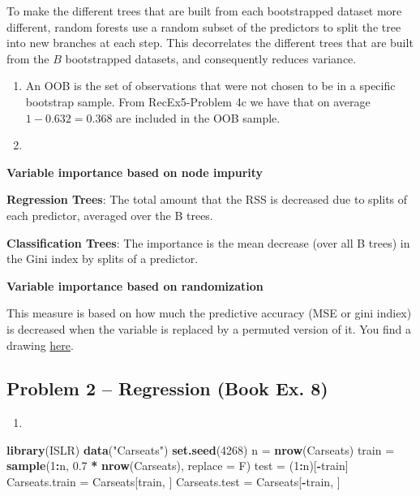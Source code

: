 \documentclass[]{article}
\newenvironment{Shaded}{\begin{snugshade}}{\end{snugshade}}
\newcommand{\DataTypeTok}[1]{\textcolor[rgb]{0.13,0.29,0.53}{#1}}
\newcommand{\DecValTok}[1]{\textcolor[rgb]{0.00,0.00,0.81}{#1}}
\newcommand{\FloatTok}[1]{\textcolor[rgb]{0.00,0.00,0.81}{#1}}
\newcommand{\KeywordTok}[1]{\textcolor[rgb]{0.13,0.29,0.53}{\textbf{#1}}}
\newcommand{\NormalTok}[1]{#1}
\newcommand{\OperatorTok}[1]{\textcolor[rgb]{0.81,0.36,0.00}{\textbf{#1}}}
\newcommand{\StringTok}[1]{\textcolor[rgb]{0.31,0.60,0.02}{#1}}
\begin{document}
To make the different trees that are built from each bootstrapped
dataset more different, random forests use a random subset of the
predictors to split the tree into new branches at each step. This
decorrelates the different trees that are built from the \(B\)
bootstrapped datasets, and consequently reduces variance.

\begin{enumerate}
\def\labelenumi{\alph{enumi})}
\setcounter{enumi}{3}
\item
  An OOB is the set of observations that were not chosen to be in a
  specific bootstrap sample. From RecEx5-Problem 4c we have that on
  average \(1-0.632 = 0.368\) are included in the OOB sample.
\item
\end{enumerate}

\textbf{Variable importance based on node impurity}

\textbf{Regression Trees}: The total amount that the RSS is decreased
due to splits of each predictor, averaged over the B trees.

\textbf{Classification Trees}: The importance is the mean decrease (over
all B trees) in the Gini index by splits of a predictor.

\textbf{Variable importance based on randomization}

This measure is based on how much the predictive accuracy (MSE or gini
indiex) is decreased when the variable is replaced by a permuted version
of it. You find a drawing
\href{https://github.com/stefaniemuff/statlearning/blob/master/8Trees/M8_variableImportanceRandomization.pdf}{here}.

\hypertarget{problem-2-regression-book-ex.-8}{%
\subsection{Problem 2 -- Regression (Book Ex.
8)}\label{problem-2-regression-book-ex.-8}}

\begin{enumerate}
\def\labelenumi{\alph{enumi})}
\item
\end{enumerate}

\begin{Shaded}
\begin{Highlighting}[]
\KeywordTok{library}\NormalTok{(ISLR)}
\KeywordTok{data}\NormalTok{(}\StringTok{"Carseats"}\NormalTok{)}
\KeywordTok{set.seed}\NormalTok{(}\DecValTok{4268}\NormalTok{)}
\NormalTok{n =}\StringTok{ }\KeywordTok{nrow}\NormalTok{(Carseats)}
\NormalTok{train =}\StringTok{ }\KeywordTok{sample}\NormalTok{(}\DecValTok{1}\OperatorTok{:}\NormalTok{n, }\FloatTok{0.7} \OperatorTok{*}\StringTok{ }\KeywordTok{nrow}\NormalTok{(Carseats), }\DataTypeTok{replace =}\NormalTok{ F)}
\NormalTok{test =}\StringTok{ }\NormalTok{(}\DecValTok{1}\OperatorTok{:}\NormalTok{n)[}\OperatorTok{-}\NormalTok{train]}
\NormalTok{Carseats.train =}\StringTok{ }\NormalTok{Carseats[train, ]}
\NormalTok{Carseats.test =}\StringTok{ }\NormalTok{Carseats[}\OperatorTok{-}\NormalTok{train, ]}
\end{Highlighting}
\end{Shaded}
\end{document}
